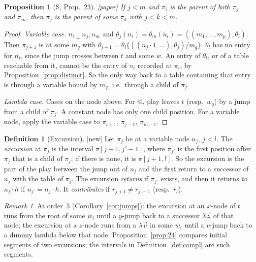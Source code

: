 \documentclass[11pt]{article}
\newcommand{\bnd}{\mathrel{\downarrow}}
\newcommand{\suc}[2]{#1{\cdot}#2}
\newcommand{\iv}[2]{\pi[#1,#2]}
\newcommand{\Paper}{\textsf{[paper]}}
\newcommand{\New}{\textsf{[new]}}
\theoremstyle{plain}
\newtheorem{proposition}[theorem]{Proposition}
\theoremstyle{definition}
\newtheorem{definition}[theorem]{Definition}
\theoremstyle{remark}
\newtheorem{remark}[theorem]{Remark}
\begin{document}
\begin{proposition}[S, Prop.~23]\label{prop:between}
\Paper{} If $j<m$ and $\pi_i$ is the parent of both $\pi_j$ and $\pi_m$,
then $\pi_j$ is the parent of some $\pi_k$ with $j<k<m$.
\end{proposition}
\begin{proof}
\emph{Variable case.} $n_i\bnd n_j,n_m$ and
$\theta_j(n_i)=\theta_m(n_i)=((m_1,\dots,m_p),\theta_l)$.  Then $\pi_{j+1}$ is
at some $m_q$ with $\theta_{j+1}=\theta_l\{((\suc{n_j}1,\dots),\theta_j)/m_q\}$.
$\theta_l$ has no entry for $n_i$, since the jump crosses between $t$ and
some $w$.  An entry of $\theta_l$, or of a table reachable from it,
cannot be the entry of $n_i$ recorded at $\pi_i$, by
Proposition~\ref{prop:distinct}.  So the only way back to a table
containing that entry is through a variable bound by $m_q$, i.e.\
through a child of $\pi_j$.

\emph{Lambda case.} Cases on the node above.  For $@$, play leaves $t$
(resp.\ $w_q$) by a jump from a child of $\pi_j$.  A constant node has
only one child position.  For a variable node, apply the variable case
to $\pi_{i+1}$, $\pi_{j-1}$, $\pi_{m-1}$.
\end{proof}

\begin{definition}[Excursion]\label{def:excursion}
\New{} Let $\pi_j$ be at a variable node $n_j$, $j<l$.  The
\emph{excursion} at $\pi_j$ is the interval $\iv{j+1}{j'-1}$, where
$\pi_{j'}$ is the first position after $\pi_j$ that is a child of
$\pi_j$; if there is none, it is $\iv{j+1}l$.  So the excursion is the
part of the play between the jump out of $n_j$ and the first return to a
successor of $n_j$ with the table of $\pi_j$.  The excursion
\emph{returns} if $\pi_{j'}$ exists, and then it returns \emph{to}
$\suc{n_j}h$ if $n_{j'}=\suc{n_j}h$.  It \emph{contributes} if
$r_{j+1}\ne r_{j'-1}$ (resp.\ $r_l$).
\end{definition}

\begin{remark}
At order~$5$ (Corollary~\ref{cor:jumps}): the excursion at an
$x$-node of $t$ runs from the root of some $w_i$ until a $y$-jump back
to a successor $\lambda\vec z$ of that node; the excursion at a
$z$-node runs from a $\lambda\vec v$ in some $w_i$ until a $v$-jump back
to a dummy lambda below that node.  Proposition~\ref{prop:24} compares
initial segments of two excursions; the intervals in
Definition~\ref{def:compl} are such segments.
\end{remark}
\end{document}
